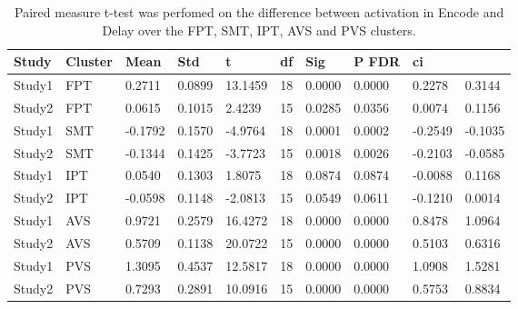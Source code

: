 \begin{table}
\centering
\begin{tabular}[0.2em]{@{}llllllllll@{}}\toprule
Study & Cluster & Mean & Std & t & df & Sig & P FDR & ci\\\toprule[0.2em]
Study1 & FPT & 0.2711 & 0.0899 & 13.1459 & 18 & 0.0000 & 0.0000 & 0.2278 & 0.3144 \\\midrule
Study2 & FPT & 0.0615 & 0.1015 & 2.4239 & 15 & 0.0285 & 0.0356 & 0.0074 & 0.1156 \\\midrule
Study1 & SMT & -0.1792 & 0.1570 & -4.9764 & 18 & 0.0001 & 0.0002 & -0.2549 & -0.1035 \\\midrule
Study2 & SMT & -0.1344 & 0.1425 & -3.7723 & 15 & 0.0018 & 0.0026 & -0.2103 & -0.0585 \\\midrule
Study1 & IPT & 0.0540 & 0.1303 & 1.8075 & 18 & 0.0874 & 0.0874 & -0.0088 & 0.1168 \\\midrule
Study2 & IPT & -0.0598 & 0.1148 & -2.0813 & 15 & 0.0549 & 0.0611 & -0.1210 & 0.0014 \\\midrule
Study1 & AVS & 0.9721 & 0.2579 & 16.4272 & 18 & 0.0000 & 0.0000 & 0.8478 & 1.0964 \\\midrule
Study2 & AVS & 0.5709 & 0.1138 & 20.0722 & 15 & 0.0000 & 0.0000 & 0.5103 & 0.6316 \\\midrule
Study1 & PVS & 1.3095 & 0.4537 & 12.5817 & 18 & 0.0000 & 0.0000 & 1.0908 & 1.5281 \\\midrule
Study2 & PVS & 0.7293 & 0.2891 & 10.0916 & 15 & 0.0000 & 0.0000 & 0.5753 & 0.8834 \\\bottomrule[0.2em]
\end{tabular}
\caption{Paired measure t-test was perfomed on the difference between activation in Encode and Delay over the FPT, SMT, IPT, AVS and PVS clusters.\label{tabel:GDEMBA}}
\end{table}
